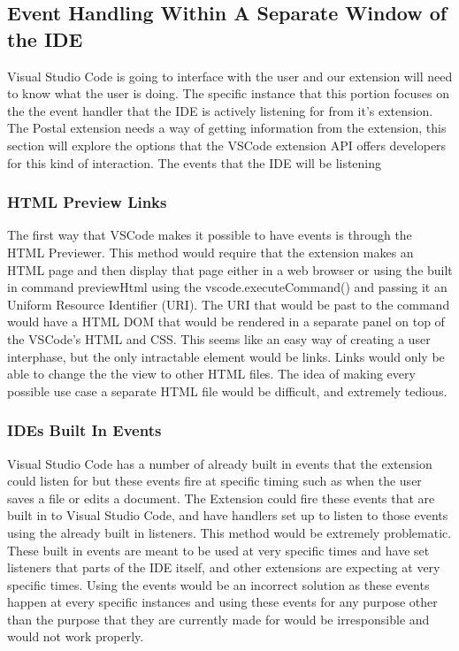 \documentclass[letterpaper,10pt,titlepage,draftclsnofoot,onecolumn,onesided] {IEEEtran}
\begin{document}
\subsection{Event Handling Within A Separate Window of the IDE}
Visual Studio Code is going to interface with the user and our extension will need to know what the user is doing.
The specific instance that this portion focuses on the the event handler that the IDE is actively listening for from it's extension.
The Postal extension needs a way of getting information from the extension, this section will explore the options that the VSCode extension API offers developers for this kind of interaction. 
The events that the IDE will be listening 

\subsubsection{HTML Preview Links}
The first way that VSCode makes it possible to have events is through the HTML Previewer. \cite{VSCodeDocumentation} 
This method would require that the extension makes an HTML page and then display that page either in a web browser or using the built in command previewHtml using the vscode.executeCommand() and passing it an Uniform Resource Identifier (URI). 
The URI that would be past to the command would have a HTML DOM that would be rendered in a separate panel on top of the VSCode's HTML and CSS. 
This seems like an easy way of creating a user interphase, but the only intractable element would be links. 
Links would only be able to change the the view to other HTML files. 
The idea of making every possible use case a separate HTML file would be difficult, and extremely tedious.

\subsubsection{IDEs Built In Events}
Visual Studio Code has a number of already built in events that the extension could listen for but these events fire at specific timing such as when the user saves a file or edits a document. 
The Extension could fire these events that are built in to Visual Studio Code, and have handlers set up to listen to those events using the already built in listeners.
This method would be extremely problematic.
These built in events are meant to be used at very specific times and have set listeners that parts of the IDE itself, and other extensions are expecting at very specific times.
Using the events would be an incorrect solution as these events happen at every specific instances and using these events for any purpose other than the purpose that they are currently made for would be irresponsible and would not work properly.
\end{document}
